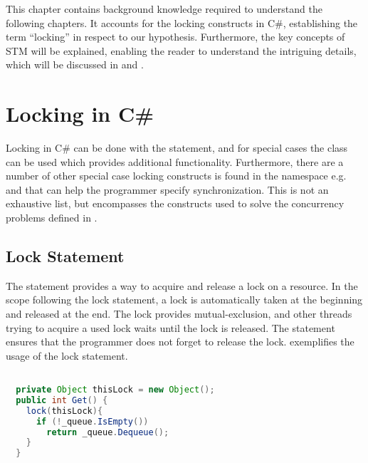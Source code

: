 \makeatletter {}\makeatother
{}
This chapter contains background knowledge required to understand the following chapters. It accounts for the locking constructs in C\#, establishing the term ``locking''  in respect to our hypothesis. Furthermore, the key concepts of \ac{STM} will be explained, enabling the reader to understand the intriguing details, which will be discussed in  and .
\label{chap:prelim}
\section{Locking in C\#}\label{sec:locking}
Locking in C\# can be done with the  statement, and for special cases the  class can be used which provides additional functionality. Furthermore, there are a number of other special case locking constructs is found in the  namespace e.g. \cite{microsoftSyncPrim,}    and  that can help the programmer specify synchronization. This is not an exhaustive list, but encompasses the constructs used to solve the concurrency problems defined in .
\subsection{Lock Statement}\label{subsec:lock_statement}
The  statement\cite[p. 102]{csharp2013specificaiton} provides a way to acquire and release a lock on a resource. In the scope following the lock statement, a lock is automatically taken at the beginning and released at the end. The lock provides mutual-exclusion, and other threads trying to acquire a used lock waits until the lock is released. The  statement ensures that the programmer does not forget to release the lock.  exemplifies the usage of the lock statement. 
\begin{lstlisting}[label=lst:lock_statement,
  caption={Lock Statement},
  language=Java,  
  showspaces=false,
  showtabs=false,
  breaklines=true,
  showstringspaces=false,
  breakatwhitespace=true,
  commentstyle=\color{greencomments},
  keywordstyle=\color{bluekeywords},
  stringstyle=\color{redstrings},
  morekeywords={atomic, retry, orElse}]  % Start your code-block

  private Object thisLock = new Object();
  public int Get() { 
    lock(thisLock){
      if (!_queue.IsEmpty())
        return _queue.Dequeue();
    }
  }
\end{lstlisting}
